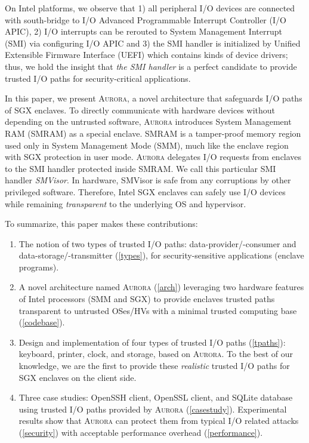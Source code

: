 \documentclass[journal,twocolumn,letterpaper,10pt]{IEEEtran}
\begin{document}
On Intel platforms, we observe that 1) all peripheral I/O devices are connected with south-bridge to I/O Advanced Programmable Interrupt Controller (I/O APIC), 2) I/O interrupts can be rerouted to System Management Interrupt (SMI) via configuring I/O APIC and 3) the SMI handler is initialized by Unified Extensible Firmware Interface (UEFI) which contains kinds of device drivers; thus, we hold the insight that \textit{the SMI handler} is a perfect candidate to provide trusted I/O paths for security-critical applications.

In this paper, we present \textsc{Aurora}, a novel architecture that safeguards I/O paths of SGX enclaves. To directly communicate with hardware devices without depending on the untrusted software, \textsc{Aurora} introduces System Management RAM (SMRAM) as a special enclave. SMRAM is a tamper-proof memory region used only in System Management Mode (SMM), much like the enclave region with SGX protection in user mode. \textsc{Aurora} delegates I/O requests from enclaves to the SMI handler protected inside SMRAM. We call this particular SMI handler \textit{SMVisor}. In hardware, SMVisor is safe from any corruptions by other privileged software. Therefore, Intel SGX enclaves can safely use I/O devices while remaining \textit{transparent} to the underlying OS and hypervisor.

To summarize, this paper makes these contributions:
\begin{enumerate}[]
\item The notion of two types of trusted I/O paths: data-provider/-consumer and data-storage/-transmitter (\autoref{types}), for security-sensitive applications (enclave programs).
\item A novel architecture named \textsc{Aurora} (\autoref{arch}) leveraging two hardware features of Intel processors (SMM and SGX) to provide enclaves trusted paths transparent to untrusted OSes/HVs with a minimal trusted computing base (\autoref{codebase}).
\item Design and implementation of four types of trusted I/O paths (\autoref{tpaths}): keyboard, printer, clock, and storage, based on \textsc{Aurora}.  To the best of our knowledge, we are the first to provide these \emph{realistic} trusted I/O paths for SGX enclaves on the client side.
\item Three case studies: OpenSSH client, OpenSSL client, and SQLite database using trusted I/O paths provided by \textsc{Aurora} (\autoref{casestudy}). Experimental results show that \textsc{Aurora} can protect them from typical I/O related attacks (\autoref{security}) with acceptable performance overhead (\autoref{performance}).
\end{enumerate}
\end{document}
